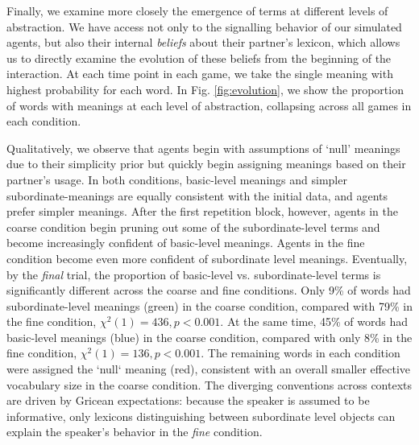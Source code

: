 Finally, we examine more closely the emergence of terms at different levels of abstraction.
We have access not only to the signalling behavior of our simulated agents, but also their internal \emph{beliefs} about their partner's lexicon, which allows us to directly examine the evolution of these beliefs from the beginning of the interaction.
At each time point in each game, we take the single meaning with highest probability for each word.
In Fig. \ref{fig:evolution}, we show the proportion of words with meanings at each level of abstraction, collapsing across all games in each condition.

Qualitatively, we observe that agents begin with assumptions of `null' meanings  due to their simplicity prior but quickly begin assigning meanings based on their partner's usage.
In both conditions, basic-level meanings and simpler subordinate-meanings  are equally consistent with the initial data, and agents prefer simpler meanings.
After the first repetition block, however, agents in the coarse condition begin pruning out some of the subordinate-level terms and become increasingly confident of basic-level meanings.
Agents in the fine condition become even more confident of subordinate level meanings.
Eventually, by the \emph{final} trial, the proportion of basic-level vs. subordinate-level terms is significantly different across the coarse and fine conditions.
Only 9\% of words had subordinate-level meanings (green) in the coarse condition, compared with 79\% in the fine condition, $\chi^2(1) = 436, p < 0.001$.
At the same time, 45\% of words had basic-level meanings (blue) in the coarse condition, compared with only 8\% in the fine condition, $\chi^2(1) = 136, p < 0.001$.
The remaining words in each condition were assigned the `null` meaning (red), consistent with an overall smaller effective vocabulary size in the coarse condition.
The diverging conventions across contexts are driven by Gricean expectations: because the speaker is assumed to be informative, only lexicons distinguishing between subordinate level objects can explain the speaker's behavior in the \emph{fine} condition.

